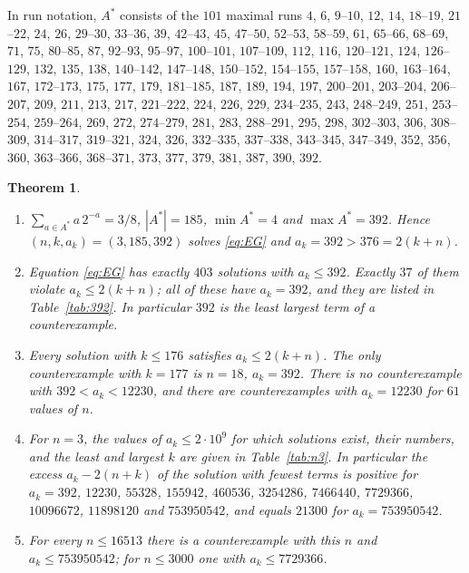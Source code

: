\documentclass[11pt]{amsart}
\newtheorem{theorem}{Theorem}[section]
\theoremstyle{definition}
\theoremstyle{remark}
\begin{document}
In run notation, $A^*$ consists of the $101$ maximal runs
$4$, $6$, $9$--$10$, $12$, $14$, $18$--$19$, $21$--$22$, $24$, $26$, $29$--$30$, $33$--$36$, $39$, $42$--$43$, $45$, $47$--$50$, $52$--$53$, $58$--$59$, $61$, $65$--$66$, $68$--$69$, $71$, $75$, $80$--$85$, $87$, $92$--$93$, $95$--$97$, $100$--$101$, $107$--$109$, $112$, $116$, $120$--$121$, $124$, $126$--$129$, $132$, $135$, $138$, $140$--$142$, $147$--$148$, $150$--$152$, $154$--$155$, $157$--$158$, $160$, $163$--$164$, $167$, $172$--$173$, $175$, $177$, $179$, $181$--$185$, $187$, $189$, $194$, $197$, $200$--$201$, $203$--$204$, $206$--$207$, $209$, $211$, $213$, $217$, $221$--$222$, $224$, $226$, $229$, $234$--$235$, $243$, $248$--$249$, $251$, $253$--$254$, $259$--$264$, $269$, $272$, $274$--$279$, $281$, $283$, $288$--$291$, $295$, $298$, $302$--$303$, $306$, $308$--$309$, $314$--$317$, $319$--$321$, $324$, $326$, $332$--$335$, $337$--$338$, $343$--$345$, $347$--$349$, $352$, $356$, $360$, $363$--$366$, $368$--$371$, $373$, $377$, $379$, $381$, $387$, $390$, $392$.

\begin{theorem}\label{thm:counter}
\begin{enumerate}[label=\textup{(\alph*)}]
\item $\sum_{a\in A^*}a\,2^{-a}=3/8$, $|A^*|=185$, $\min A^*=4$ and $\max A^*=392$. Hence $(n,k,a_k)=(3,185,392)$ solves \eqref{eq:EG} and $a_k=392>376=2(k+n)$.
\item Equation \eqref{eq:EG} has exactly $403$ solutions with $a_k\le392$. Exactly $37$ of them violate $a_k\le2(k+n)$; all of these have $a_k=392$, and they are listed in Table~\ref{tab:392}. In particular $392$ is the least largest term of a counterexample.
\item Every solution with $k\le176$ satisfies $a_k\le2(k+n)$. The only counterexample with $k=177$ is $n=18$, $a_k=392$. There is no counterexample with $392<a_k<12230$, and there are counterexamples with $a_k=12230$ for $61$ values of $n$.
\item For $n=3$, the values of $a_k\le 2\cdot10^9$ for which solutions exist, their numbers, and the least and largest $k$ are given in Table~\ref{tab:n3}. In particular the excess $a_k-2(n+k)$ of the solution with fewest terms is positive for $a_k=392$, $12230$, $55328$, $155942$, $460536$, $3254286$, $7466440$, $7729366$, $10096672$, $11898120$ and $753950542$, and equals $21300$ for $a_k=753950542$.
\item For every $n\le 16513$ there is a counterexample with this $n$ and $a_k\le 753950542$; for $n\le3000$ one with $a_k\le7729366$.
\end{enumerate}
\end{theorem}
\end{document}
